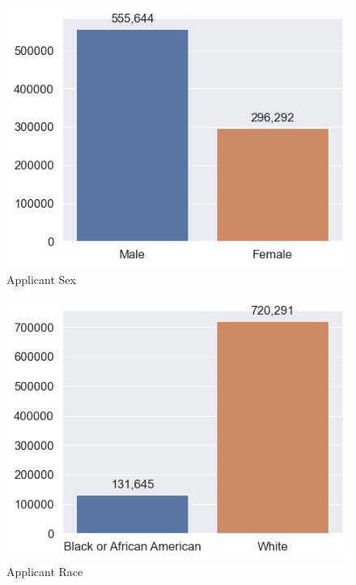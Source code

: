 \begin{figure}[h]
    \centering
    \begin{minipage}{0.5\textwidth}
        \centering
        \includegraphics[width=\textwidth]{images/HMDA_features/HMDA_features_sex.png}
        \small
        Applicant Sex
    \end{minipage}\hfill
    \begin{minipage}{0.5\textwidth}
        \centering
        \includegraphics[width=\textwidth]{images/HMDA_features/HMDA_features_race.png}
        \small
        Applicant Race
    \end{minipage}
    


\end{figure}
